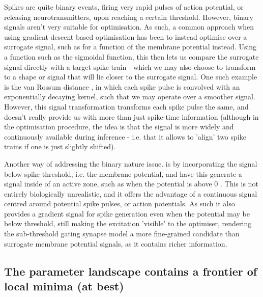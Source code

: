 \documentclass[mphil,deptreport,ianc]{infthesis} %
\begin{document}
Spikes are quite binary events, firing very rapid pulses of action potential, or releasing neurotransmitters, upon reaching a certain threshold.
However, binary signals aren't very suitable for optimisation. As such, a common approach when using gradient descent based optimisation has been to instead optimise over a surrogate signal, such as for a function of the membrane potential instead. Using a function such as the sigmoidal function, this then lets us compare the surrogate signal directly with a target spike train - which we may also choose to transform to a shape or signal that will lie closer to the surrogate signal.
One such example is the van Rossum distance \cite{VanRossum2001}, in which each spike pulse is convolved with an exponentially decaying kernel, such that we may operate over a smoother signal. 
However, this signal transformation transforms each spike pulse the same, and doesn't really provide us with more than just spike-time information (although in the optimisation procedure, the idea is that the signal is more widely and continuously available during inference - i.e. that it allows to 'align' two spike trains if one is just slightly shifted).

Another way of addressing the binary nature issue. is by incorporating the signal below spike-threshold, i.e. the membrane potential, and have this generate a signal inside of an active zone, such as when the potential is above 0 \cite{Huh2017}. 
This is not entirely biologically unrealistic, and it offers the advantage of a continuous signal centred around potential spike pulses, or action potentials. 
As such it also provides a gradient signal for spike generation even when the potential may be below threshold, still making the excitation 'visible' to the optimiser, rendering the sub-threshold gating synapse model a more fine-grained candidate than surrogate membrane potential signals, as it contains richer information.




\subsection*{The parameter landscape contains a frontier of local minima (at best)}
\end{document}

